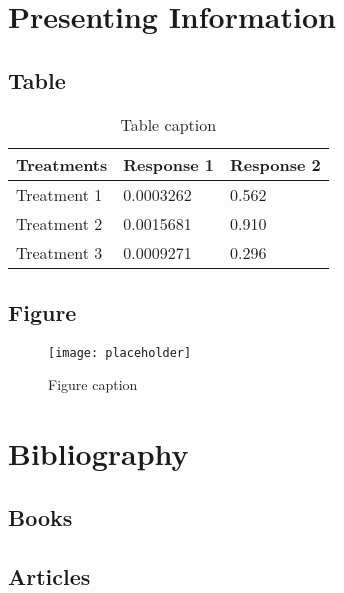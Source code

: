 \documentclass[11pt,fleqn]{book} %
\begin{document}

\chapter{Presenting Information}

\section{Table}

\begin{table}[h]
\centering
\begin{tabular}{l l l}
\toprule
\textbf{Treatments} & \textbf{Response 1} & \textbf{Response 2}\\
\midrule
Treatment 1 & 0.0003262 & 0.562 \\
Treatment 2 & 0.0015681 & 0.910 \\
Treatment 3 & 0.0009271 & 0.296 \\
\bottomrule
\end{tabular}
\caption{Table caption}
\end{table}


\section{Figure}

\begin{figure}[h]
\centering\texttt{[image: placeholder]}
\caption{Figure caption}
\end{figure}


\chapter*{Bibliography}
\section*{Books}
\printbibliography[heading=bibempty,type=book]
\section*{Articles}
\printbibliography[heading=bibempty,type=article]


\cleardoublepage
{}
\setlength{\columnsep}{0.75cm}
\printindex

\end{document}
